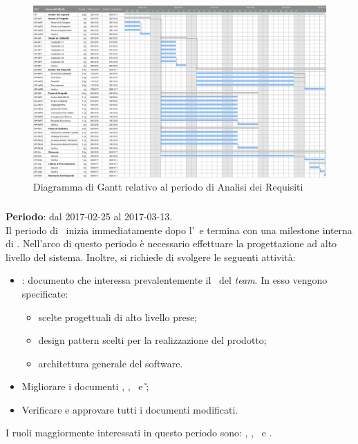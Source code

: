 		\begin{figure}[ht]
			\centering
			\includegraphics[angle=90,scale=0.37]{img/ganttnetbreak1.png}
			\caption{Diagramma di Gantt relativo al periodo di Analisi dei Requisiti}
		\end{figure}
		\FloatBarrier
		
		
		\subsubsection{\PA}
		\textbf{Periodo}: dal 2017-02-25 al 2017-03-13.\\
		Il periodo di \PA\ inizia immediatamente dopo l'\AR\ e termina con una milestone interna di \RPMin. Nell'arco di questo periodo è necessario effettuare la progettazione ad alto livello del sistema. Inoltre, si richiede di svolgere le seguenti attività:
		\begin{itemize}
			\item \textit{\ST}: documento che interessa prevalentemente il \textit{\Prog}\ del \textit{team}. In esso vengono specificate:
			\begin{itemize}
				\item scelte progettuali di alto livello prese;
				\item design pattern scelti per la realizzazione del prodotto;
				\item architettura generale del software.
			\end{itemize}
			\item Migliorare i documenti \NdP, \PdP, \PdQ\ e \G;
			\item Verificare e approvare tutti i documenti modificati.
		\end{itemize}
		I ruoli maggiormente interessati in questo periodo sono: \textit{\Amm}, \textit{\Res}, \textit{\Prog}\ e \textit{\Ver}.
		
